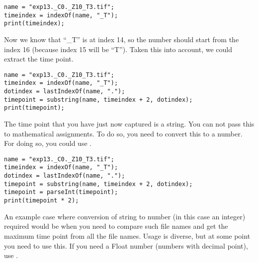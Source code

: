 \begin{lstlisting}
name = "exp13._C0._Z10_T3.tif";
timeindex = indexOf(name, "_T");
print(timeindex);
\end{lstlisting}

Now we know that ``\_T'' is at index 14, so the number should start from the index 16 (because index 15 will be ``T''). Taken this into account, we could extract the time point. 

\begin{lstlisting}
name = "exp13._C0._Z10_T3.tif";
timeindex = indexOf(name, "_T");
dotindex = lastIndexOf(name, ".");
timepoint = substring(name, timeindex + 2, dotindex);
print(timepoint);
\end{lstlisting}

The time point that you have just now captured is a string. You can not pass this to mathematical assignments. To do so, you need to convert this to a number. For doing so, you could use . 

\begin{lstlisting}
name = "exp13._C0._Z10_T3.tif";
timeindex = indexOf(name, "_T");
dotindex = lastIndexOf(name, ".");
timepoint = substring(name, timeindex + 2, dotindex);
timepoint = parseInt(timepoint);
print(timepoint * 2);
\end{lstlisting}

An example case where conversion of string to number (in this case an integer) required would be when you need to compare such file names and get the maximum time point from all the file names. Usage is diverse, but at some point you need to use this. If you need a Float number (numbers with decimal point), use .